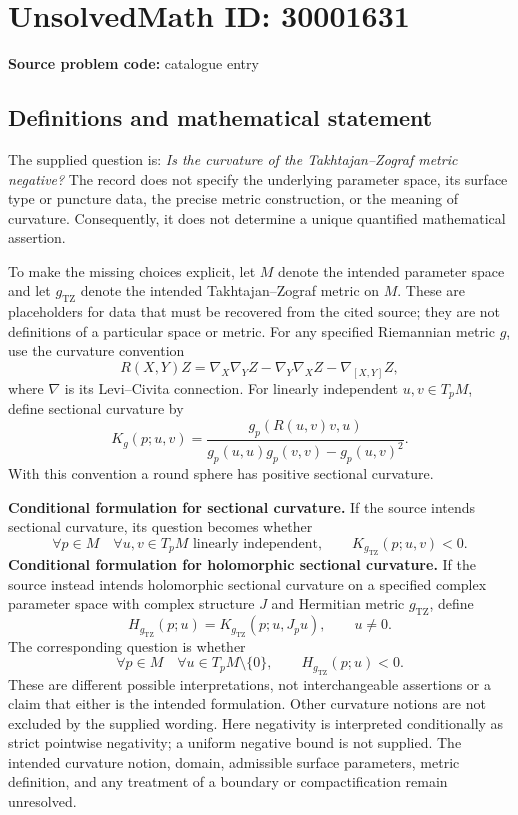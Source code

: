 \documentclass[11pt]{article}
\begin{document}
\section*{UnsolvedMath ID: 30001631}
\textbf{Source problem code:} catalogue entry
\subsection{Definitions and mathematical statement}
The supplied question is: \emph{Is the curvature of the Takhtajan--Zograf metric negative?} The record does not specify the underlying parameter space, its surface type or puncture data, the precise metric construction, or the meaning of curvature. Consequently, it does not determine a unique quantified mathematical assertion.

To make the missing choices explicit, let \(M\) denote the intended parameter space and let \(g_{\mathrm{TZ}}\) denote the intended Takhtajan--Zograf metric on \(M\). These are placeholders for data that must be recovered from the cited source; they are not definitions of a particular space or metric. For any specified Riemannian metric \(g\), use the curvature convention
\[
R(X,Y)Z=\nabla_X\nabla_Y Z-\nabla_Y\nabla_X Z-\nabla_{[X,Y]}Z,
\]
where \(\nabla\) is its Levi--Civita connection. For linearly independent \(u,v\in T_pM\), define sectional curvature by
\[
K_g(p;u,v)=\frac{g_p(R(u,v)v,u)}{g_p(u,u)g_p(v,v)-g_p(u,v)^2}.
\]
With this convention a round sphere has positive sectional curvature.

\textbf{Conditional formulation for sectional curvature.} If the source intends sectional curvature, its question becomes whether
\[
\forall p\in M\quad\forall u,v\in T_pM\text{ linearly independent},\qquad K_{g_{\mathrm{TZ}}}(p;u,v)<0.
\]
\textbf{Conditional formulation for holomorphic sectional curvature.} If the source instead intends holomorphic sectional curvature on a specified complex parameter space with complex structure \(J\) and Hermitian metric \(g_{\mathrm{TZ}}\), define
\[
H_{g_{\mathrm{TZ}}}(p;u)=K_{g_{\mathrm{TZ}}}(p;u,J_pu),\qquad u\ne0.
\]
The corresponding question is whether
\[
\forall p\in M\quad\forall u\in T_pM\setminus\{0\},\qquad H_{g_{\mathrm{TZ}}}(p;u)<0.
\]
These are different possible interpretations, not interchangeable assertions or a claim that either is the intended formulation. Other curvature notions are not excluded by the supplied wording. Here negativity is interpreted conditionally as strict pointwise negativity; a uniform negative bound is not supplied. The intended curvature notion, domain, admissible surface parameters, metric definition, and any treatment of a boundary or compactification remain unresolved.
\end{document}

